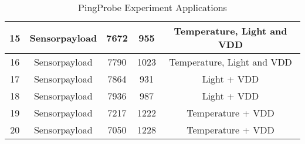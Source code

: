 \begin{table}[!ht]
\begin{tabular}{|c|c|c|c|c|}
15                   & Sensorpayload        & 7672          & 955                    & Temperature, Light and VDD \\ \hline
16                   & Sensorpayload        & 7790          & 1023                   & Temperature, Light and VDD \\ \hline
17                   & Sensorpayload        & 7864          & 931                    & Light + VDD                \\ \hline
18                   & Sensorpayload        & 7936          & 987                    & Light + VDD                \\ \hline
19                   & Sensorpayload        & 7217          & 1222                   & Temperature + VDD          \\ \hline
20                   & Sensorpayload        & 7050          & 1228                   & Temperature + VDD          \\ \hline
\end{tabular}
\caption{PingProbe Experiment Applications}
\label{PingProbeApps}
\end{table}
